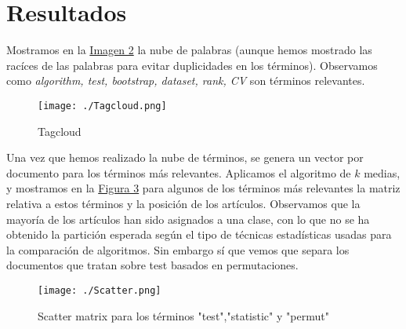 \documentclass[11pt]{article}
\begin{document}
\section{Resultados}
\label{sec:orgd77498d}

Mostramos en la \hyperref[fig:orgda7cefc]{Imagen 2} la nube de palabras (aunque hemos mostrado
las racíces de las palabras para evitar duplicidades en los
términos). Observamos como \emph{algorithm, test, bootstrap, dataset, rank,
CV} son términos relevantes.


\begin{figure}[htbp]
\centering
\texttt{[image: ./Tagcloud.png]}
\caption{\label{fig:orgda7cefc}
Tagcloud}
\end{figure}


Una vez que hemos realizado la nube de términos, se genera un vector
por documento para los términos más relevantes. Aplicamos el algoritmo
de \(k\) medias, y mostramos en la \hyperref[fig:orge0f1e51]{Figura 3} para algunos de los términos más relevantes
la matriz relativa a estos términos y la posición de los
artículos. Observamos que la mayoría de los artículos han sido
asignados a una clase, con lo que no se ha obtenido la partición
esperada según el tipo de técnicas estadísticas usadas para la
comparación de algoritmos. Sin embargo sí que vemos que separa los
documentos que tratan sobre test basados en permutaciones.

\begin{figure}[htbp]
\centering
\texttt{[image: ./Scatter.png]}
\caption{\label{fig:orge0f1e51}
Scatter matrix para los términos "test","statistic" y "permut"}
\end{figure}
\end{document}
